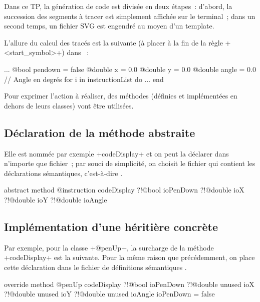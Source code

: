 
Dans ce TP, la génération de code est divisée en deux étapes~: d'abord, la succession des segments à tracer est simplement affichée sur le terminal~; dans un second temps, un fichier SVG est engendré au moyen d'un template.

L'allure du calcul des tracés est la suivante (à placer à la fin de la règle \ggst+<start_symbol>+) dans ~:

\begin{galgas3}
  ...
  @bool pendown = false
  @double x = 0.0
  @double y = 0.0
  @double angle = 0.0 // Angle en degrés
  for i in instructionList do
    ...
  end
\end{galgas3}

Pour exprimer l'action à réaliser, des méthodes (définies et implémentées en dehors de leurs classes) vont être utilisées.

\subsection{Déclaration de la méthode abstraite}
Elle est nommée par exemple \ggst+codeDisplay+ et on peut la déclarer dans n'importe que fichier~; par souci de simplicité, on choisit le fichier qui contient les déclarations sémantiques, c'est-à-dire .

\begin{galgas3}
abstract method @instruction codeDisplay
  ?!@bool ioPenDown
  ?!@double ioX
  ?!@double ioY
  ?!@double ioAngle
\end{galgas3}

\subsection{Implémentation d'une héritière concrète}

Par exemple, pour la classe \ggst+@penUp+, la surcharge de la méthode \ggst+codeDisplay+ est la suivante. Pour la même raison que précédemment, on place cette déclaration dans le fichier de définitions sémantiques .

\begin{galgas3}
override method @penUp codeDisplay
  ?!@bool ioPenDown
  ?!@double unused ioX
  ?!@double unused ioY
  ?!@double unused ioAngle
{
  ioPenDown = false
}
\end{galgas3}

